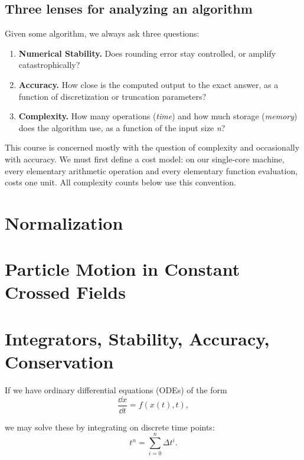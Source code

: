 \subsection{Three lenses for analyzing an algorithm}
Given some algorithm, we always ask three questions:
\begin{enumerate}

    \item \textbf{Numerical Stability.} Does rounding error stay controlled, 
                           or amplify catastrophically?

    \item \textbf{Accuracy.} How close is the computed output to the exact answer,
                as a function of discretization or truncation parameters?

    \item \textbf{Complexity.} How many operations (\textit{time}) and how much
                  storage (\textit{memory}) does the algorithm use, as a function
                  of the input size \textit{n}?

\end{enumerate}

\begin{note}
    This course is concerned mostly with the question of complexity and
    occasionally with accuracy. We must first define a cost model: on our
    single-core machine, every elementary arithmetic operation and every 
    elementary function evaluation, costs one unit. All complexity counts
    below use this convention.
\end{note}


\section{Normalization}
\section{Particle Motion in Constant Crossed Fields}
\section{Integrators, Stability, Accuracy, Conservation}
If we have ordinary differential equations (ODEs) of the form
\begin{equation}
  \frac{\dd x}{\dd t} = f(x(t), t),
\end{equation}

we may solve these by integrating on discrete time points:
\begin{equation}
  t^n = \sum_{i = 0}^n \Delta t^i.
\end{equation}

